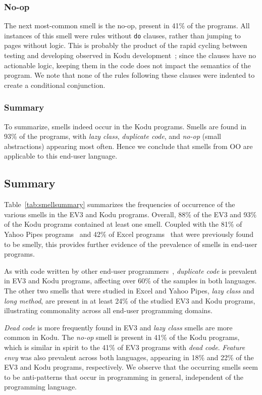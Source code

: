 \documentclass{sig-alternate}
\begin{document}
\subsubsection{No-op}
The next most-common smell is the no-op, present in 41\% of the programs. All instances of this smell were rules without {\tt do} clauses, rather than jumping to pages without logic.  This is probably the product of the rapid cycling between testing and developing observed in Kodu development~\cite{Stolee:2011:ECS:1953163.1953197}; since the clauses have no actionable logic, keeping them in the code does not impact the semantics of the program. We note that none of the rules following these clauses were indented to create a conditional conjunction. 


\subsubsection{Summary}
To summarize, smells indeed occur in the Kodu programs. Smells are found in 93\% of the programs, with \emph{lazy class}, \emph{duplicate code},  and \emph{no-op} (small abstractions) appearing most often. Hence we conclude that smells from OO are applicable to this end-user language. 

\subsection{Summary}
Table~\ref{tab:smellsummary} summarizes the frequencies of occurrence of the various smells in the EV3 and Kodu programs. Overall, 88\% of the EV3 and 93\% of the Kodu programs contained at least one smell. Coupled with the 81\% of Yahoo Pipes programs~\cite{StoleeTSE2013} and 42\% of Excel programs~\cite{Hermans2012intra} that were previously found to be smelly, this provides further evidence of the prevalence of smells in end-user programs. 

As with code written by other end-user programmers~\cite{StoleeTSE2013}, \emph{duplicate code} is prevalent in EV3 and Kodu programs, affecting over 60\% of the samples in both languages. The other two smells that were studied in Excel and Yahoo Pipes, \emph{lazy class} and \emph{long method}, are present in at least 24\% of the studied EV3 and Kodu programs, illustrating commonality across all end-user programming domains. 

\emph{Dead code} is more frequently found in EV3 and \emph{lazy class} smells are more common in Kodu. The \emph{no-op} smell is present in 41\% of the Kodu programs, which is similar in spirit to the 41\% of EV3 programs with \emph{dead code}. \emph{Feature envy} was also prevalent across both languages, appearing in 18\% and 22\% of the EV3 and Kodu programs, respectively. 
We observe that the occurring smells seem to be anti-patterns that occur in programming in general, independent of the programming language. 
\end{document}

